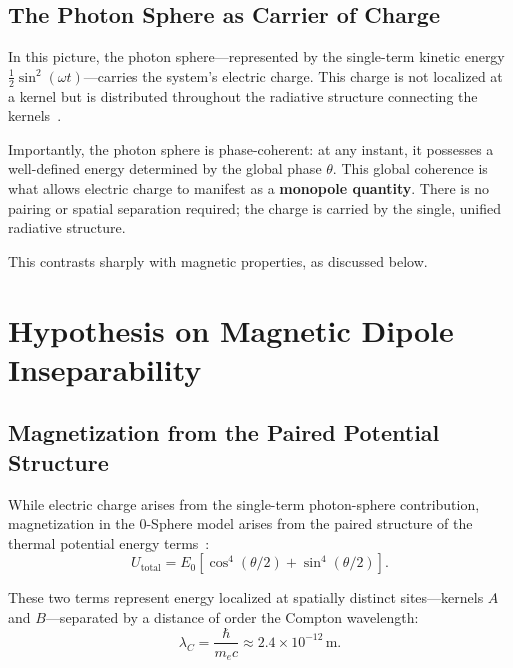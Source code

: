 \documentclass[12pt,letterpaper]{article}
\begin{document}
\subsection{The Photon Sphere as Carrier of Charge}

In this picture, the photon sphere---represented by the single-term kinetic energy $\frac{1}{2}\sin^2(\omega t)$---carries the system's electric charge. This charge is not localized at a kernel but is distributed throughout the radiative structure connecting the kernels~\cite{hanamura18603340}.

Importantly, the photon sphere is phase-coherent: at any instant, it possesses a well-defined energy determined by the global phase $\theta$. This global coherence is what allows electric charge to manifest as a \textbf{monopole quantity}. There is no pairing or spatial separation required; the charge is carried by the single, unified radiative structure.

This contrasts sharply with magnetic properties, as discussed below.

\section{Hypothesis on Magnetic Dipole Inseparability}

\subsection{Magnetization from the Paired Potential Structure}

While electric charge arises from the single-term photon-sphere contribution, magnetization in the 0-Sphere model arises from the paired structure of the thermal potential energy terms~\cite{hanamura18356895}:
\begin{equation}
U_{\mathrm{total}} = E_0 \left[ \cos^4(\theta/2) + \sin^4(\theta/2) \right].
\end{equation}

These two terms represent energy localized at spatially distinct sites---kernels $A$ and $B$---separated by a distance of order the Compton wavelength:
\begin{equation}
\lambda_C = \frac{\hbar}{m_e c} \approx 2.4 \times 10^{-12} \, \mathrm{m}.
\end{equation}
\end{document}
